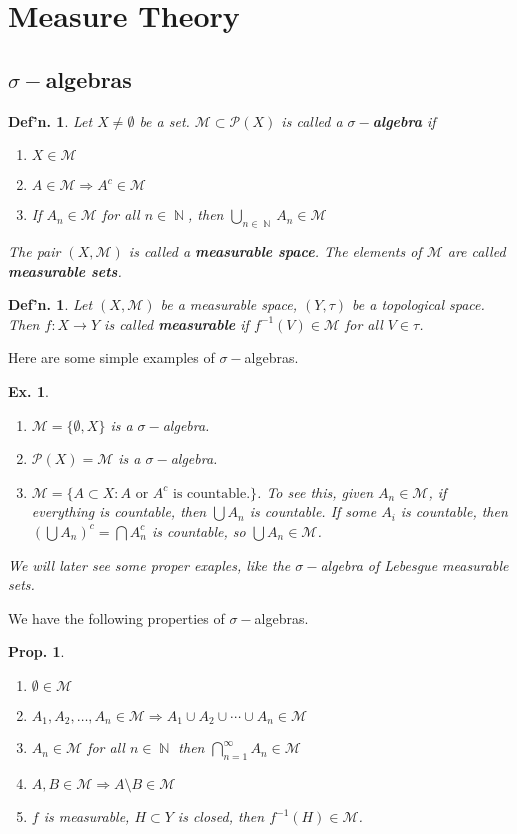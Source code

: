 \documentclass[12pt, a4paper]{book}
\DeclareMathOperator{\N}{\mathbb{N}}
\newtheorem{definition}[theorem]{Def'n.}
\newtheorem{proposition}[theorem]{Prop.}
\newtheorem{example}[theorem]{Ex.}
\theoremstyle{nonumberplain}
\begin{document}
\section{Measure Theory}
\subsection{$\sigma-$algebras}
\begin{definition}
    Let $X\neq\emptyset$ be a set.
    $\mathcal{M}\subset\mathcal{P}(X)$ is called a \textbf{$\sigma-$algebra} if
    \begin{enumerate}[nolistsep]
        \item $X\in \mathcal{M}$
        \item $A\in\mathcal{M}\Rightarrow A^c\in\mathcal{M}$
        \item If $A_n\in\mathcal{M}$ for all $n\in\N$, then $\bigcup\limits_{n\in\N}A_n\in\mathcal{M}$
    \end{enumerate}
    The pair $(X,\mathcal{M})$ is called a \textbf{measurable space}.
    The elements of $\mathcal{M}$ are called \textbf{measurable sets}.
\end{definition}
\begin{definition}
    Let $(X,\mathcal{M})$ be a measurable space, $(Y,\tau)$ be a topological space.
    Then $f:X\to Y$ is called \textbf{measurable} if $f^{-1}(V)\in\mathcal{M}$ for all $V\in\tau$.
\end{definition}
Here are some simple examples of $\sigma-$algebras.
\begin{example}
    \begin{enumerate}
        \item $\mathcal{M}=\{\emptyset,X\}$ is a $\sigma-$algebra.
        \item $\mathcal{P}(X)=\mathcal{M}$ is a $\sigma-$algebra.
        \item $\mathcal{M}=\{A\subset X:A\text{ or }A^c\text{ is countable.}\}$.
            To see this, given $A_n\in\mathcal{M}$, if everything is countable, then $\bigcup A_n$ is countable.
            If some $A_i$ is countable, then $(\bigcup A_n)^c=\bigcap A_n^c$ is countable, so $\bigcup A_n\in\mathcal{M}$.
    \end{enumerate}
    We will later see some proper exaples, like the $\sigma-$algebra of Lebesgue measurable sets.
\end{example}
We have the following properties of $\sigma-$algebras.
\begin{proposition}
    \begin{enumerate}[nolistsep]
        \item $\emptyset\in\mathcal{M}$
        \item $A_1,A_2,\ldots,A_n\in\mathcal{M}\Rightarrow A_1\cup A_2\cup\cdots \cup A_n\in\mathcal{M}$
        \item $A_n\in\mathcal{M}$ for all $n\in\N$ then $\bigcap_{n=1}^\infty A_n\in\mathcal{M}$
        \item $A,B\in\mathcal{M}\Rightarrow A\setminus B\in\mathcal{M}$
        \item $f$ is measurable, $H\subset Y$ is closed, then $f^{-1}(H)\in\mathcal{M}$.
    \end{enumerate}
\end{proposition}
\end{document}
